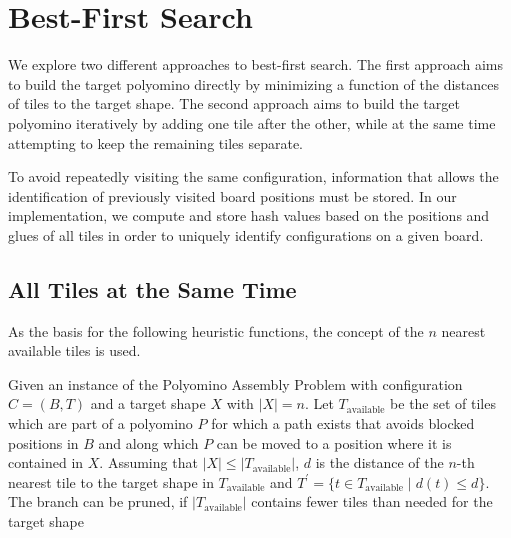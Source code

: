 \section {Best-First Search}
We explore two different approaches to best-first search. The first approach aims to build the target polyomino directly by minimizing a function of the distances of tiles to the target shape. The second approach aims to build the target polyomino iteratively by adding one tile after the other, while at the same time attempting to keep the remaining tiles separate. \par
To avoid repeatedly visiting the same configuration, information that allows the identification of previously visited board positions must be stored. In our implementation, we compute and store hash values based on the positions and glues of all tiles in order to uniquely identify configurations on a given board.

\subsection {All Tiles at the Same Time}
As the basis for the following heuristic functions, the concept of the $n$ nearest available tiles is used. \par
Given an instance of the Polyomino Assembly Problem with configuration $C = (B, T)$ and a target shape $X$ with $|X| = n$. Let $T_{\text{available}}$ be the set of tiles which are part of a polyomino $P$ for which a path exists that avoids blocked positions in $B$ and along which $P$ can be moved to a position where it is contained in $X$. Assuming that $|X| \leq |T_{\text{available}}|$, $d$ is the distance of the $n$-th nearest tile to the target shape in $T_{\text{available}}$ and $T^\prime= \{t \in T_{ \text{available}} \mid d(t) \leq d \}$.
The branch can be pruned, if $|T_{\text{available}}|$ contains fewer tiles than needed for the target shape

